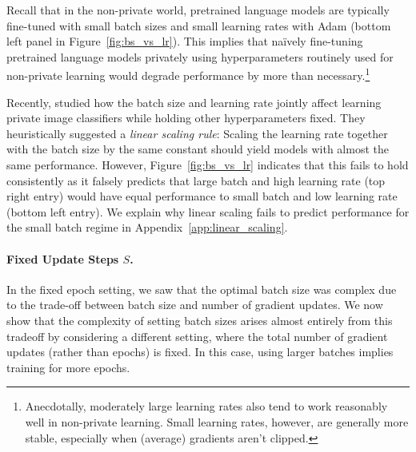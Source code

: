 Recall that in the non-private world, pretrained language models are typically fine-tuned with small batch sizes and small learning rates with Adam (bottom left panel in Figure~\ref{fig:bs_vs_lr}).
This implies that na\"ively fine-tuning pretrained language models privately using hyperparameters routinely used for non-private learning would degrade performance by more than necessary.\footnote{Anecdotally, moderately large learning rates also tend to work reasonably well in non-private learning. Small learning rates, however, are generally more stable, especially when (average) gradients aren't clipped.}

Recently, \cite{tramer2020differentially} studied how the batch size and learning rate jointly affect learning private image classifiers while holding other hyperparameters fixed.
They heuristically suggested a \textit{linear scaling rule}: Scaling the learning rate together with the batch size by the same constant should yield models with almost the same performance. 
However, Figure~\ref{fig:bs_vs_lr} indicates that this fails to hold consistently as it falsely predicts that large batch and high learning rate (top right entry) would have equal performance to small batch and low learning rate (bottom left entry).
We explain why linear scaling fails to predict performance for the small batch regime in Appendix~\ref{app:linear_scaling}. 

\paragraph{Fixed Update Steps $S$.}
In the fixed epoch setting, we saw that the optimal batch size was complex due to the trade-off between batch size and number of gradient updates.
We now show that the complexity of setting batch sizes arises almost entirely from this tradeoff by considering a different setting, where the total number of gradient updates (rather than epochs) is fixed.
In this case, using larger batches implies training for more epochs.

